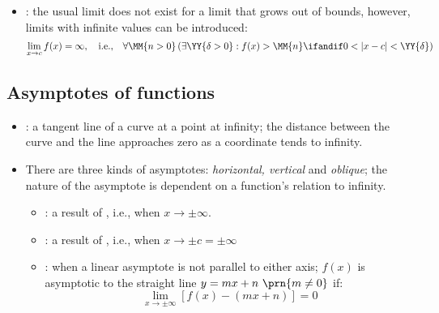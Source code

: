 \begin{itemize}
\begin{itemize}
\begin{itemize}
      \end{itemize}

    \item {}: the usual limit does not exist for a limit that
      grows out of bounds, however, limits with infinite values can be
      introduced:
      \[
        \lim_{x \to c} f(x) = \infty, \quad \text{i.e.,} \quad
        \forall \MM{n > 0}\left(
          \exists \YY{ \delta > 0} : f(x) > \MM{n} \ifandif 0 < |x-c| < \YY{ \delta}
        \right)
      \]
  \end{itemize}

  \subsection{Asymptotes of functions}
  \begin{itemize}
    \item {}: a tangent line of a curve at a point at infinity; the
      distance between the curve and the line approaches zero as a coordinate
      tends to infinity.
    \item There are three kinds of asymptotes: \textit{horizontal, vertical}
      and \textit{oblique}; the nature of the asymptote is dependent on a
      function's relation to infinity.
      \begin{itemize}
        \item  {}: a result of , i.e., when \( x \to \pm \infty \).
        \item {}: a result of ,
          i.e., when \( x \to \pm c = \pm \infty \)
        \item {}: when a linear asymptote is not parallel
          to either axis; \( f(x) \) is asymptotic to the straight line \( y =
          mx + n~ \prn{m\neq 0} \) if:
          \[
            \lim_{x \to \pm \infty} \left[ f(x) - (mx+n) \right] = 0
          \]
      \end{itemize}

  \end{itemize}

\end{itemize}

